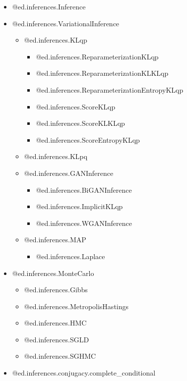 \begin{itemize}
  \item @{ed.inferences.Inference}
  \item @{ed.inferences.VariationalInference}
    \begin{itemize}
    \item @{ed.inferences.KLqp}
      \begin{itemize}
      \item @{ed.inferences.ReparameterizationKLqp}
      \item @{ed.inferences.ReparameterizationKLKLqp}
      \item @{ed.inferences.ReparameterizationEntropyKLqp}
      \item @{ed.inferences.ScoreKLqp}
      \item @{ed.inferences.ScoreKLKLqp}
      \item @{ed.inferences.ScoreEntropyKLqp}
      \end{itemize}
    \item @{ed.inferences.KLpq}
    \item @{ed.inferences.GANInference}
      \begin{itemize}
      \item @{ed.inferences.BiGANInference}
      \item @{ed.inferences.ImplicitKLqp}
      \item @{ed.inferences.WGANInference}
      \end{itemize}
    \item @{ed.inferences.MAP}
      \begin{itemize}
      \item @{ed.inferences.Laplace}
      \end{itemize}
    \end{itemize}
  \item @{ed.inferences.MonteCarlo}
    \begin{itemize}
    \item @{ed.inferences.Gibbs}
    \item @{ed.inferences.MetropolisHastings}
    \item @{ed.inferences.HMC}
    \item @{ed.inferences.SGLD}
    \item @{ed.inferences.SGHMC}
    \end{itemize}
  \item @{ed.inferences.conjugacy.complete_conditional}
\end{itemize}
